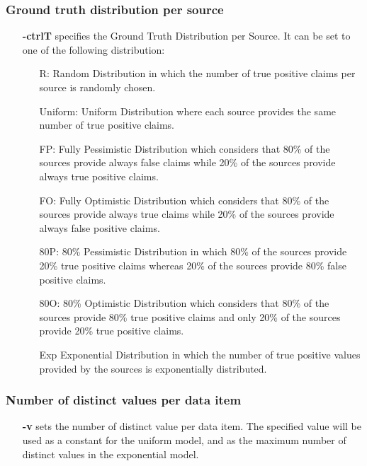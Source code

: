 \documentclass[a4paper,10pt]{scrartcl}
\begin{document}
\subsubsection{Ground truth distribution per source}
\begin{itemize}
 \item[\textbf{-ctrlT}] specifies the Ground Truth Distribution per Source. It can be set to one of the following distribution:
 \begin{itemize}
  \item[R:] Random Distribution in which the number of true positive claims per source is randomly chosen.
  \item[Uniform:] Uniform Distribution where each source provides the same number of true positive claims.
  \item[FP:] Fully Pessimistic Distribution which considers that 80\% of the sources provide always false claims
  while 20\% of the sources provide always true positive claims.
  \item[FO:] Fully Optimistic Distribution which considers that 80\% of the sources provide always true claims
  while 20\% of the sources provide always false positive claims.
  \item[80P:] 80\% Pessimistic Distribution in which 80\% of the sources provide 20\% true positive claims whereas
  20\% of the sources provide 80\% false positive claims. 
  \item[80O:] 80\% Optimistic Distribution which considers that 80\% of the sources provide 80\% true positive claims 
  and only 20\% of the sources provide 20\% true positive claims.
  \item[Exp] Exponential Distribution in which the number of true positive values provided by the sources is exponentially
  distributed.
 \end{itemize}
\end{itemize}
\subsubsection{Number of distinct values per data item}
\begin{itemize}
 \item[\textbf{-v}] sets the number of distinct value per data item. The specified value will be used as a constant for the uniform 
 model, and as the maximum number of distinct values in the exponential model.
\end{itemize}
\end{document}
